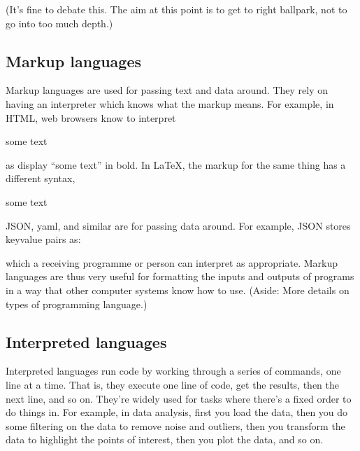 \documentclass[letterpaper,10pt,british]{sphinxmanual}
\begin{document}
\sphinxAtStartPar
(It’s fine to debate this. The aim at this point is to get to right ballpark, not to go into too much depth.)


\subsection{Markup languages}
\label{\detokenize{chapters/motivation/language_types:markup-languages}}
\sphinxAtStartPar
Markup languages are used for passing text and data around. They rely on having an interpreter which knows what the markup means. For example, in HTML, web browsers know to interpret

\begin{sphinxVerbatim}[commandchars=\\\{\}]
some text
\end{sphinxVerbatim}

\sphinxAtStartPar
as display “some text” in bold. In LaTeX, the markup for the same thing has a different syntax,

\begin{sphinxVerbatim}[commandchars=\\\{\}]
some text
\end{sphinxVerbatim}

\sphinxAtStartPar
JSON, yaml, and similar are for passing data around. For example, JSON stores key\sphinxhyphen{}value pairs as:

\begin{sphinxVerbatim}[commandchars=\\\{\}]
\end{sphinxVerbatim}

\sphinxAtStartPar
which a receiving programme or person can interpret as appropriate. Markup languages are thus very useful for formatting the inputs and outputs of programs in a way that other computer systems know how to use. (Aside: More details on types of programming language.)


\subsection{Interpreted languages}
\label{\detokenize{chapters/motivation/language_types:interpreted-languages}}
\sphinxAtStartPar
Interpreted languages run code by working through a series of commands, one line at a time. That is, they execute one line of code, get the results, then the next line, and so on. They’re widely used for tasks where there’s a fixed order to do things in. For example, in data analysis, first you load the data, then you do some filtering on the data to remove noise and outliers, then you transform the data to highlight the points of interest, then you plot the data, and so on.
\end{document}
